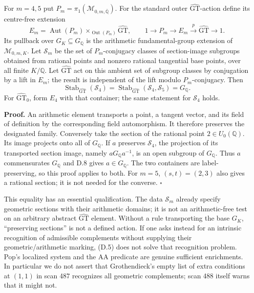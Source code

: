 \documentclass[10pt,a4paper]{article}
\begin{document}
For \(m=4,5\) put \(P_m=\pi_1(\mathcal M_{0,m,\overline{\mathbb Q}})\). For the standard outer \(\widehat{\mathrm{GT}}\)-action define its centre-free extension \[
 E_m=\operatorname{Aut}(P_m)\mathbin{\times}_{\operatorname{Out}(P_m)}\widehat{\mathrm{GT}},
 \qquad1\to P_m\to E_m\xrightarrow{p}\widehat{\mathrm{GT}}\to1.
\] Its pullback over \(G_K\subseteq G_{\mathbb Q}\) is the arithmetic fundamental-group extension of \(\mathcal M_{0,m,K}\). Let \(\mathcal S_m\) be the set of \(P_m\)-conjugacy classes of section-image subgroups obtained from rational points and nonzero rational tangential base points, over all finite \(K/\mathbb Q\). Let \(\widehat{\mathrm{GT}}\) act on this ambient set of subgroup classes by conjugation by a lift in \(E_m\); the result is independent of the lift modulo \(P_m\)-conjugacy. Then \[
 \operatorname{Stab}_{\widehat{\mathrm{GT}}}(\mathcal S_4)
 =\operatorname{Stab}_{\widehat{\mathrm{GT}}}(\mathcal S_4,\mathcal S_5)
 =G_{\mathbb Q}. \tag{D.5}
\] For \(\widehat{\mathrm{GT}}_0\), form \(E_4\) with that container; the same statement for \(\mathcal S_4\) holds.

\textbf{Proof.} An arithmetic element transports a point, a tangent vector, and its field of definition by the corresponding field automorphism. It therefore preserves the designated family. Conversely take the section of the rational point \(2\in U_0(\mathbb Q)\). Its image projects onto all of \(G_{\mathbb Q}\). If \(a\) preserves \(\mathcal S_4\), the projection of its transported section image, namely \(aG_{\mathbb Q}a^{-1}\), is an open subgroup of \(G_{\mathbb Q}\). Thus \(a\) commensurates \(G_{\mathbb Q}\) and D.8 gives \(a\in G_{\mathbb Q}\). The two containers are label-preserving, so this proof applies to both. For \(m=5\), \((s,t)=(2,3)\) also gives a rational section; it is not needed for the converse. \(\square\)

This equality has an essential qualification. The data \(\mathcal S_m\) already specify geometric sections with their arithmetic domains; it is not an arithmetic-free test on an arbitrary abstract \(\widehat{\mathrm{GT}}\) element. Without a rule transporting the base \(G_K\), ``preserving sections'' is not a defined action. If one asks instead for an intrinsic recognition of admissible complements without supplying their geometric/arithmetic marking, (D.5) does not solve that recognition problem. Pop's localized system and the AA predicate are genuine sufficient enrichments. In particular we do not assert that Grothendieck's empty list of extra conditions at \((1,1)\) in scan 487 recognizes all geometric complements; scan 488 itself warns that it might not.
\end{document}
